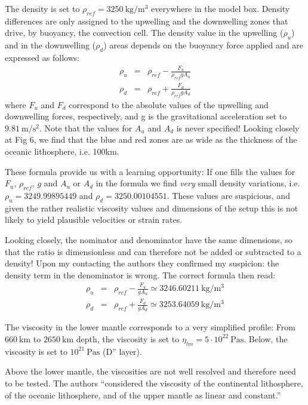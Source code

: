 The density is set to $\rho_{ref}=3250~\si{\kg\per\cubic\meter}$ everywhere in the model box. Density
differences are only assigned to the upwelling and the
downwelling zones that drive, by buoyancy, the convection
cell. The density value in the upwelling ($\rho_u$) and
in the downwelling ($\rho_d$) areas depends on the buoyancy force
applied and are expressed as follows:
\begin{eqnarray}
\rho_u &=& \rho_{ref} - \frac{F_u}{\rho_{ref} g A_u} \\
\rho_d &=& \rho_{ref} + \frac{F_d}{\rho_{ref} g A_d} 
\end{eqnarray}
where $F_u$ and $F_d$ correspond to the absolute values of the 
upwelling and downwelling forces, respectively, and g is the gravitational 
acceleration set to $9.81~\si{\meter\per\square\second}$.
Note that the values for $A_u$ and $A_d$ is never specified!
Looking closely at Fig 6, we find that the blue and red zones are as wide as 
the thickness of the oceanic lithosphere, i.e. 100km.

These formula provide us with a learning opportunity:
If one fills the values for $F_u$, $\rho_{ref}$, $g$ and $A_u$ or $A_d$
in the formula we find {\it very} small density variations, i.e.
$\rho_u=3249.99895449$ and $\rho_d=3250.00104551$. 
These values are suspicious, and given the rather realistic viscosity
values and dimensions of the setup this is not likely to yield 
plausible velocities or strain rates. 

Looking closely, the nominator and denominator have the same dimensions, 
so that the ratio is dimensionless and can therefore not be 
added or subtracted to a density! Upon my contacting the authors they confirmed
my suspicion: the density term in the denominator is wrong.
The correct formula then read:
\begin{eqnarray}
\rho_u &=& \rho_{ref} - \frac{F_u}{ g A_u} \simeq 3246.60211~\si{\kg\per\cubic\meter} \\
\rho_d &=& \rho_{ref} + \frac{F_d}{ g A_d} \simeq 3253.64059~\si{\kg\per\cubic\meter} 
\end{eqnarray}

The viscosity in the lower mantle corresponds
to a very simplified profile: From $660~\si{\km}$ to $2650~\si{\km}$ depth,
the viscosity is set to $\eta_{lm}=5\cdot 10^{22}~\si{\pascal\second}$. 
Below, the viscosity is set to $10^{21}~\si{\pascal\second}$ (D'' layer). 

Above the lower mantle, the viscosities
are not well resolved and therefore need to be tested.
The authors ``considered the viscosity of the continental 
lithosphere, of the oceanic lithosphere, and of the
upper mantle as linear and constant.''

